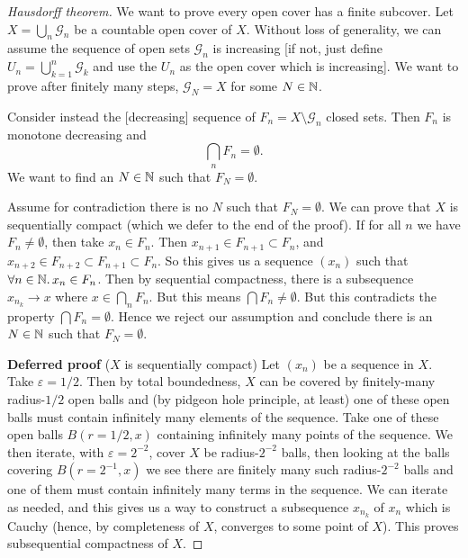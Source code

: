 \begin{proof}[Hausdorff theorem]
We want to prove every open cover has a finite subcover. Let
$X=\bigcup_{n}\mathcal{G}_{n}$ be a countable open cover of $X$.
Without loss of generality, we can assume the sequence of open sets
$\mathcal{G}_{n}$ is increasing [if not, just define
  $U_{n}=\bigcup^{n}_{k=1}\mathcal{G}_{k}$ and use the $U_{n}$ as the
  open cover which is increasing].
We want to prove after finitely many steps, $\mathcal{G}_{N}=X$ for
some $N\in\mathbb{N}$.

Consider instead the [decreasing] sequence of $F_{n}=X\setminus\mathcal{G}_{n}$
closed sets. Then $F_{n}$ is monotone decreasing and
\begin{equation}
\bigcap_{n}F_{n}=\emptyset.
\end{equation}
We want to find an $N\in\mathbb{N}$ such that $F_{N}=\emptyset$.

Assume for contradiction there is no $N$ such that $F_{N}=\emptyset$.
We can prove that $X$ is sequentially compact (which we defer to the end of the proof).
If for all $n$ we have $F_{n}\neq\emptyset$, then take $x_{n}\in F_{n}$.
Then $x_{n+1}\in F_{n+1}\subset F_{n}$,
and $x_{n+2}\in F_{n+2}\subset F_{n+1}\subset F_{n}$. So this gives us
a sequence $(x_{n})$ such that $\forall n\in\mathbb{N}\ldotp x_{n}\in F_{n}$.
Then by sequential compactness, there is a subsequence $x_{n_{k}}\to x$
where $x\in\bigcap_{n}F_{n}$. But this means $\bigcap F_{n}\neq\emptyset$.
But this contradicts the property $\bigcap F_{n}=\emptyset$. Hence we
reject our assumption and conclude there is an $N\in\mathbb{N}$ such that
$F_{N}=\emptyset$. 

\textbf{Deferred proof} ($X$ is sequentially compact)
Let $(x_{n})$ be a sequence in $X$. Take $\varepsilon=1/2$. Then by
total boundedness, $X$ can be covered by finitely-many radius-$1/2$ open balls
and (by pidgeon hole principle, at least) one of these open balls must contain
infinitely many elements of the sequence.
Take one of these open balls $B(r=1/2, x)$ containing infinitely many
points of the sequence. We then iterate, with $\varepsilon=2^{-2}$,
cover $X$ be radius-$2^{-2}$ balls, then looking at the balls covering
$B(r=2^{-1},x)$ we see there are finitely many such radius-$2^{-2}$
balls and one of them must contain infinitely many terms in the
sequence. We can iterate as needed, and this gives us a way to
construct a subsequence $x_{n_{k}}$ of $x_{n}$ which is Cauchy (hence,
by completeness of $X$, converges to some
point of $X$). This proves subsequential compactness of $X$.
\end{proof}